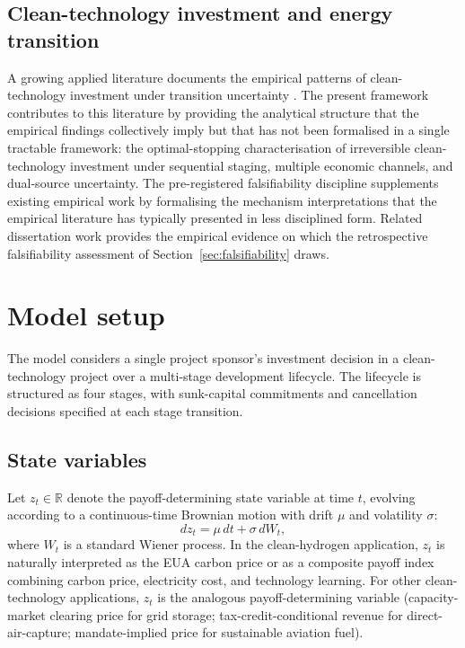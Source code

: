 \documentclass[12pt,a4paper]{article}
\newcommand{\R}{\mathbb{R}}
\theoremstyle{plain}
\theoremstyle{definition}
\begin{document}
\subsection{Clean-technology investment and energy transition}
\label{sec:lit-clean-tech}

A growing applied literature documents the empirical patterns of clean-technology investment under transition uncertainty \citep{popp2010innovation, fischer2008environmental, acemoglu2012environment, calel2020adoption}. The present framework contributes to this literature by providing the analytical structure that the empirical findings collectively imply but that has not been formalised in a single tractable framework: the optimal-stopping characterisation of irreversible clean-technology investment under sequential staging, multiple economic channels, and dual-source uncertainty. The pre-registered falsifiability discipline supplements existing empirical work by formalising the mechanism interpretations that the empirical literature has typically presented in less disciplined form. Related dissertation work \citep{saakstra2026thesis, saakstra2026paper2, saakstra2026paper3} provides the empirical evidence on which the retrospective falsifiability assessment of Section~\ref{sec:falsifiability} draws.

\section{Model setup}
\label{sec:model}

The model considers a single project sponsor's investment decision in a clean-technology project over a multi-stage development lifecycle. The lifecycle is structured as four stages, with sunk-capital commitments and cancellation decisions specified at each stage transition.

\subsection{State variables}
\label{sec:model-state}

Let $z_t \in \R$ denote the payoff-determining state variable at time $t$, evolving according to a continuous-time Brownian motion with drift $\mu$ and volatility $\sigma$:
\begin{equation}
dz_t = \mu \, dt + \sigma \, dW_t,
\label{eq:state-process}
\end{equation}
where $W_t$ is a standard Wiener process. In the clean-hydrogen application, $z_t$ is naturally interpreted as the EUA carbon price or as a composite payoff index combining carbon price, electricity cost, and technology learning. For other clean-technology applications, $z_t$ is the analogous payoff-determining variable (capacity-market clearing price for grid storage; tax-credit-conditional revenue for direct-air-capture; mandate-implied price for sustainable aviation fuel).
\end{document}
